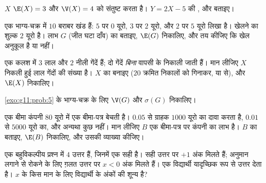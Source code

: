 \begin{exercise}[$\star$]\label{exo:g11:prob:4}
$X$ $\E(X) = 3$ और $\V(X) = 4$ को संतुष्ट करता है। $Y = 2X - 5$ की ,  और  बताइए।
\end{exercise}

\begin{exercise}[$\star\star$]\label{exo:g11:prob:5}
एक भाग्य-चक्र में $10$ बराबर खंड हैं: $5$ पर $0$ यूरो, $3$ पर $2$
यूरो, और $2$ पर $5$ यूरो लिखा है। खेलने का शुल्क $2$ यूरो है। लाभ $G$
(जीत घटा दाँव) का  बताइए, $\E(G)$ निकालिए, और तय कीजिए कि खेल अनुकूल है या
नहीं।
\end{exercise}

\begin{exercise}[$\star\star$]\label{exo:g11:prob:6}
एक कलश में $3$ लाल और $2$ नीली गेंदें हैं; दो गेंदें \emph{बिना} वापसी
के निकाली जाती हैं। मान लीजिए $X$ निकली हुई लाल गेंदों की संख्या है। $X$
का  बनाइए ($20$ क्रमित निकालों को गिनाकर, या  से), और $\E(X)$
निकालिए।
\end{exercise}

\begin{exercise}[$\star\star$]\label{exo:g11:prob:7}
\cref{exo:g11:prob:5} के भाग्य-चक्र के लिए $\V(G)$ और $\sigma(G)$ निकालिए।
\end{exercise}

\begin{exercise}[$\star\star$]\label{exo:g11:prob:8}
एक बीमा कंपनी $80$ यूरो में एक बीमा-पत्र बेचती है।  $0.05$ से
ग्राहक $1000$ यूरो का दावा करता है,  $0.01$ से $5000$ यूरो का, और
अन्यथा कुछ नहीं। मान लीजिए $B$ एक बीमा-पत्र पर कंपनी का लाभ है। $B$ का
 बताइए, $\E(B)$ निकालिए, और उसकी व्याख्या कीजिए।
\end{exercise}

\begin{exercise}[$\star\star$]\label{exo:g11:prob:9}
एक बहुविकल्पीय प्रश्न में $4$ उत्तर हैं, जिनमें एक सही है। सही उत्तर पर
$+1$ अंक मिलते हैं; अनुमान लगाने से रोकने के लिए ग़लत उत्तर पर $x < 0$ अंक
मिलते हैं। एक विद्यार्थी यादृच्छिक रूप से उत्तर देता है। $x$ के किस मान के
लिए विद्यार्थी के अंकों की  शून्य है?
\end{exercise}

